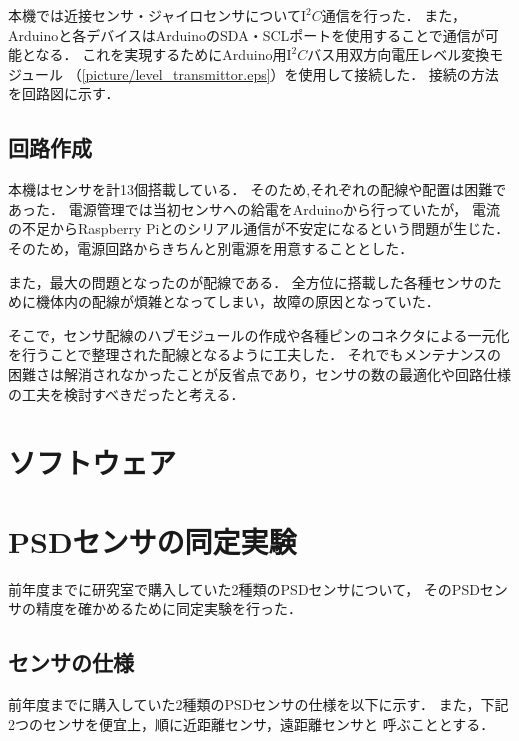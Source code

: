 \documentclass[11pt,a4]{jsarticle}
\begin{document}
    本機では近接センサ・ジャイロセンサについて$\mathrm{I^2}C$通信を行った．
    また，Arduinoと各デバイスはArduinoのSDA・SCLポートを使用することで通信が可能となる．
    これを実現するためにArduino用$\mathrm{I^2}C$バス用双方向電圧レベル変換モジュール
    （\ref{picture/level_transmittor.eps}）を使用して接続した．
    接続の方法を回路図に示す．


  \subsection{回路作成}
    本機はセンサを計13個搭載している．
    そのため,それぞれの配線や配置は困難であった．
    電源管理では当初センサへの給電をArduinoから行っていたが，
    電流の不足からRaspberry Piとのシリアル通信が不安定になるという問題が生じた．
    そのため，電源回路からきちんと別電源を用意することとした．

    また，最大の問題となったのが配線である．
    全方位に搭載した各種センサのために機体内の配線が煩雑となってしまい，故障の原因となっていた．

    そこで，センサ配線のハブモジュールの作成や各種ピンのコネクタによる一元化を行うことで整理された配線となるように工夫した．
    それでもメンテナンスの困難さは解消されなかったことが反省点であり，センサの数の最適化や回路仕様の工夫を検討すべきだったと考える．

\section{ソフトウェア}

\section{PSDセンサの同定実験}
\label{psdex}

前年度までに研究室で購入していた2種類のPSDセンサについて，
そのPSDセンサの精度を確かめるために同定実験を行った．

\subsection{センサの仕様}
前年度までに購入していた2種類のPSDセンサの仕様を以下に示す．
また，下記2つのセンサを便宜上，順に近距離センサ，遠距離センサと
呼ぶこととする．\\
\end{document}
